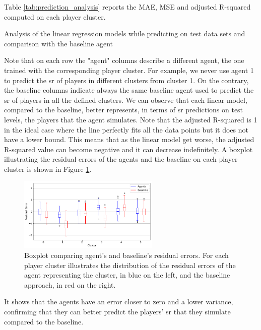 Table \ref{tab:prediction_analysis} reports the MAE, MSE and adjusted R-squared computed on each player cluster. 
\begin{table}[b]
    \centering
    \small
    \caption{Analysis of the linear regression models while predicting on test data sets and comparison with the baseline agent} 
    
    \label{tab:prediction_analysis}
\end{table}
Note that on each row the "agent" columns describe a different agent, the one trained with the corresponding player cluster. For example, we never use agent 1 to predict the \acs{sr} of players in different clusters from cluster 1. On the contrary, the baseline columns indicate always the same baseline agent used to predict the \acs{sr} of players in all the defined clusters. We can observe that each linear model, compared to the baseline, better represents, in terms of \acs{sr} predictions on test levels, the players that the agent simulates. Note that the adjusted R-squared is 1 in the ideal case where the line perfectly fits all the data points but it does not have a lower bound. This means that as the linear model get worse, the adjusted R-squared value can become negative and it can decrease indefinitely. A boxplot illustrating the residual errors of the agents and the baseline on each player cluster is shown in Figure \ref{fig:boxplot}.
\begin{figure}[t]
    \centering
    \includegraphics[width=0.6\textwidth]{masters-thesis-master/masters-thesis/contents/04_results/Player_Modeling/Clustering/plots/boxplot.png}
    \caption{Boxplot comparing agent's and baseline's residual errors. For each player cluster illustrates the distribution of the residual errors of the agent representing the cluster, in blue on the left, and the baseline approach, in red on the right.}
    \label{fig:boxplot}
\end{figure}
It shows that the agents have an error closer to zero and a lower variance, confirming that they can better predict the players' \acs{sr} that they simulate compared to the baseline.


